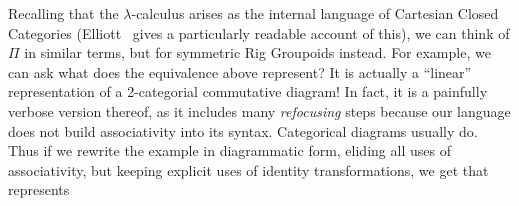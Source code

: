Recalling that the $\lambda$-calculus arises as the internal language of Cartesian Closed Categories
(Elliott~\cite{Elliott-2017} gives a particularly readable account of this), we can think of $\Pi$ in similar terms, but
for symmetric Rig Groupoids instead. For example, we can ask what does the equivalence above represent? It is actually a
``linear'' representation of a 2-categorial commutative diagram! In fact, it is a painfully verbose version thereof, as
it includes many \emph{refocusing} steps because our language does not build associativity into its syntax. Categorical
diagrams usually do.  Thus if we rewrite the example in diagrammatic form, eliding all uses of associativity, but
keeping explicit uses of identity transformations, we get that  represents

\vspace*{3mm}



